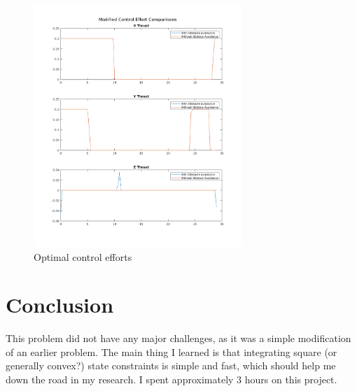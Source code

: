 \documentclass{article}
\begin{document}
\begin{figure}[H]
  \centering
  \includegraphics[width=0.7\textwidth]{images/control_mod.png}
  \caption{Optimal control efforts}
  \label{fig:controls-modified}
\end{figure}

\section*{Conclusion}

This problem did not have any major challenges, as it was a simple modification of an earlier problem.
The main thing I learned is that integrating square (or generally convex?) state constraints is simple and fast, which should help me down the road in my research.
I spent approximately 3 hours on this project.
\end{document}
